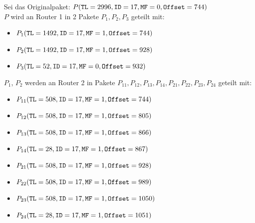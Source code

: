 \documentclass[12pt, a4paper]{article}
\begin{document}
Sei das Originalpaket: $P(\verb|TL|=2996, \verb|ID|=17, \verb|MF|=0, \verb|Offset|=744)$\\

$P$ wird an Router 1 in 2 Pakete $P_1, P_2, P_3$ geteilt mit:

\begin{itemize}
	\item	$P_1(\verb|TL|=1492, \verb|ID|=17, \verb|MF|=1, \verb|Offset|=744)$
	\item	$P_2(\verb|TL|=1492, \verb|ID|=17, \verb|MF|=1, \verb|Offset|=928)$
	\item	$P_3(\verb|TL|=52, \verb|ID|=17, \verb|MF|=0, \verb|Offset|=932)$
\end{itemize}

$P_1$, $P_2$ werden an Router 2 in Pakete $P_{11}, P_{12}, P_{13}, P_{14}, P_{21}, P_{22}, P_{23}, P_{24}$ geteilt mit:

\begin{itemize}
	\item	$P_{11}(\verb|TL|=508, \verb|ID|=17, \verb|MF|=1, \verb|Offset|=744)$
	\item	$P_{12}(\verb|TL|=508, \verb|ID|=17, \verb|MF|=1, \verb|Offset|=805)$
	\item	$P_{13}(\verb|TL|=508, \verb|ID|=17, \verb|MF|=1, \verb|Offset|=866)$
	\item	$P_{14}(\verb|TL|=28, \verb|ID|=17, \verb|MF|=1, \verb|Offset|=867)$
\\
	\item	$P_{21}(\verb|TL|=508, \verb|ID|=17, \verb|MF|=1, \verb|Offset|=928)$
	\item	$P_{22}(\verb|TL|=508, \verb|ID|=17, \verb|MF|=1, \verb|Offset|=989)$
	\item	$P_{23}(\verb|TL|=508, \verb|ID|=17, \verb|MF|=1, \verb|Offset|=1050)$
	\item	$P_{24}(\verb|TL|=28, \verb|ID|=17, \verb|MF|=1, \verb|Offset|=1051)$
\end{itemize}


\newpage
\end{document}
